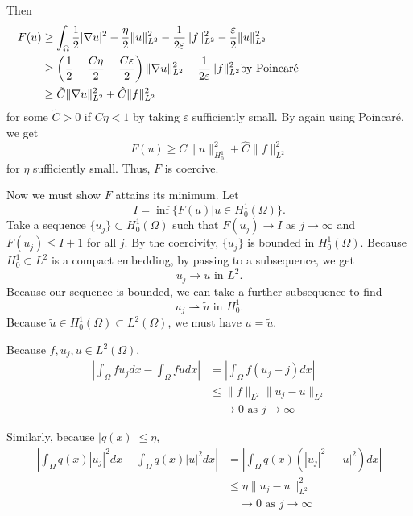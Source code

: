 \documentclass[a4paper]{article}
\begin{document}
\begin{enumerate}
    Then
    \begin{align*}
      F(u) &\geq \int_{\Omega}^{} \frac{1}{2} | \nabla u|^2 - \frac{\eta}{2} \|u\|_{L^2}^2 - \frac{1}{2 \varepsilon} \|f\|_{L^2}^2 -
      \frac{\varepsilon}{2} \|u\|_{L^2}^2 \\
      &\geq \left( \frac{1}{2} - \frac{C \eta}{2} - \frac{C \varepsilon}{2} \right) \|\nabla u\|_{L^2}^2 - \frac{1}{2\varepsilon} \|f\|_{L^2}^2
      \parbox{5cm}{by Poincar\'{e}} \\
      &\geq \tilde{C} \|\nabla u\|_{L^2}^2 + \hat{C} \|f\|_{L^2}^2
    \end{align*}
    for some $\tilde{C} >0$ if $C \eta < 1$ by taking $\varepsilon$ sufficiently small. By again using Poincar\'{e}, we get
    \[ F(u) \geq C \|u\|_{H^1_0}^2 + \hat{C} \|f\|_{L^2}^2 \]
    for $\eta$ sufficiently small. Thus, $F$ is coercive.

    Now we must show $F$ attains its minimum. Let
    \[ I = \inf \{ F(u) | u\in H^1_0(\Omega) \} .\]
    Take a sequence $\{u_j\} \subset H_0^1(\Omega)$ such that $F(u_j) \to I$ as $j \to \infty$ and $F(u_j) \leq I+1$ for all $j$. By the coercivity,
    $\{ u_j \}$ is bounded in $H_0^1(\Omega)$. Because $H^1_0 \subset L^2$ is a compact embedding, by passing to a subsequence, we get
    \[ u_j \to u \text{ in } L^2 .\]
    Because our sequence is bounded, we can take a further subsequence to find
    \[ u_j \rightharpoonup \tilde{u} \text{ in } H^1_0 .\]
    Because $\tilde{u} \in H^1_0(\Omega) \subset L^2(\Omega)$, we must have $u = \tilde{u}$.

    Because $f, u_j, u \in L^2(\Omega)$,
    \begin{align*}
      \left| \int_{\Omega}^{} f u_j dx - \int_{\Omega}^{} fu dx \right| &= \left| \int_{\Omega}^{} f (u_j - j)dx \right| \\
      &\leq \|f\|_{L^2} \|u_j - u\|_{L^2} \\
      &\quad \to 0 \text{ as } j \to \infty
    \end{align*}

    Similarly, because $|q(x)| \leq \eta$,
    \begin{align*}
      \left| \int_{\Omega}^{} q(x) |u_j|^2 dx - \int_{\Omega}^{} q(x) |u|^2 dx \right| &= \left| \int_{\Omega}^{} q(x) \left( |u_j|^2 - |u|^2 \right)
      dx \right| \\
      &\leq \eta \|u_j - u\|_{L^2}^2 \\
      &\quad \to 0 \text{ as } j \to \infty
    \end{align*}


\end{enumerate}
\end{document}
